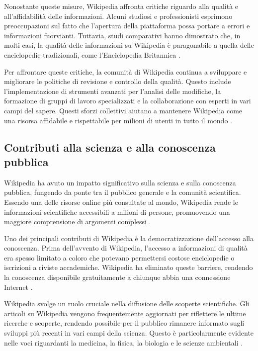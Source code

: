 \documentclass[12pt,a4paper]{report}
\begin{document}
Nonostante queste misure, Wikipedia affronta critiche riguardo alla qualità e all'affidabilità delle informazioni. Alcuni studiosi e professionisti esprimono preoccupazioni sul fatto che l'apertura della piattaforma possa portare a errori e informazioni fuorvianti. Tuttavia, studi comparativi hanno dimostrato che, in molti casi, la qualità delle informazioni su Wikipedia è paragonabile a quella delle enciclopedie tradizionali, come l'Enciclopedia Britannica \cite{giles2005nature}.

Per affrontare queste critiche, la comunità di Wikipedia continua a sviluppare e migliorare le politiche di revisione e controllo della qualità. Questo include l'implementazione di strumenti avanzati per l'analisi delle modifiche, la formazione di gruppi di lavoro specializzati e la collaborazione con esperti in vari campi del sapere. Questi sforzi collettivi aiutano a mantenere Wikipedia come una risorsa affidabile e rispettabile per milioni di utenti in tutto il mondo \cite{jemielniak2014wikipedia}.

\subsection{Contributi alla scienza e alla conoscenza pubblica}

Wikipedia ha avuto un impatto significativo sulla scienza e sulla conoscenza pubblica, fungendo da ponte tra il pubblico generale e la comunità scientifica. Essendo una delle risorse online più consultate al mondo, Wikipedia rende le informazioni scientifiche accessibili a milioni di persone, promuovendo una maggiore comprensione di argomenti complessi \cite{reagle2010good}.

Uno dei principali contributi di Wikipedia è la democratizzazione dell'accesso alla conoscenza. Prima dell'avvento di Wikipedia, l'accesso a informazioni di qualità era spesso limitato a coloro che potevano permettersi costose enciclopedie o iscrizioni a riviste accademiche. Wikipedia ha eliminato queste barriere, rendendo la conoscenza disponibile gratuitamente a chiunque abbia una connessione Internet \cite{lih2009wikipedia}.

Wikipedia svolge un ruolo cruciale nella diffusione delle scoperte scientifiche. Gli articoli su Wikipedia vengono frequentemente aggiornati per riflettere le ultime ricerche e scoperte, rendendo possibile per il pubblico rimanere informato sugli sviluppi più recenti in vari campi della scienza. Questo è particolarmente evidente nelle voci riguardanti la medicina, la fisica, la biologia e le scienze ambientali \cite{jemielniak2014wikipedia}.
\end{document}
